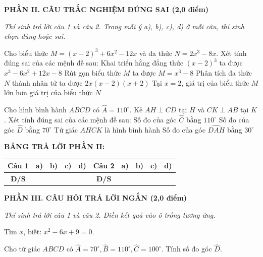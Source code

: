 \documentclass[12pt,a4paper]{article}
\begin{document}
\setcounter{ex}{0}
\noindent\textbf{\large PHẦN II. CÂU TRẮC NGHIỆM ĐÚNG SAI (2,0 điểm)}

\textit{Thí sinh trả lời câu 1 và câu 2. Trong mỗi ý a), b), c), d) ở mỗi câu, thí sinh chọn đúng hoặc sai.}

\vspace{1mm}
\begin{ex}
Cho biểu thức $M = (x - 2)^3 + 6x^2 - 12x$ và đa thức $N = 2x^3 - 8x$. Xét tính đúng sai của các mệnh đề sau:
\choiceTF
{\True Khai triển hằng đẳng thức $(x - 2)^3$ ta được $x^3 - 6x^2 + 12x - 8$}
{\True Rút gọn biểu thức $M$ ta được $M = x^3 - 8$}
{\True Phân tích đa thức $N$ thành nhân tử ta được $2x(x - 2)(x + 2)$}
{Tại $x = 2$, giá trị của biểu thức $M$ lớn hơn giá trị của biểu thức $N$}
\end{ex}

\begin{ex}
Cho hình bình hành $ABCD$ có $\widehat{A} = 110^\circ$. Kẻ $AH \perp CD$ tại $H$ và $CK \perp AB$ tại $K$. Xét tính đúng sai của các mệnh đề sau:
\choiceTF
{\True Số đo của góc $\widehat{C}$ bằng $110^\circ$}
{\True Số đo của góc $\widehat{D}$ bằng $70^\circ$}
{\True Tứ giác $AHCK$ là hình bình hành}
{Số đo của góc $\widehat{DAH}$ bằng $30^\circ$}
\end{ex}


\noindent\textbf{BẢNG TRẢ LỜI PHẦN II:}
\begin{center}
\begin{tabular}{|c|c|c|c|c||c|c|c|c|c|}
\hline
\textbf{Câu 1} & \textbf{a)} & \textbf{b)} & \textbf{c)} & \textbf{d)} & \textbf{Câu 2} & \textbf{a)} & \textbf{b)} & \textbf{c)} & \textbf{d)} \\
\hline
\textbf{Đ/S} & \rule{0pt}{0.6cm} & & & & \textbf{Đ/S} & & & & \\
\hline
\end{tabular}
\end{center}
\vspace{2mm}

\setcounter{ex}{0}
\noindent\textbf{\large PHẦN III. CÂU HỎI TRẢ LỜI NGẮN (2,0 điểm)}

\textit{Thí sinh trả lời câu 1 và câu 2. Điền kết quả vào ô trống tương ứng.}

\vspace{1mm}
\begin{ex}
Tìm $x$, biết: $x^2 - 6x + 9 = 0$. 
\end{ex}

\begin{ex}
Cho tứ giác $ABCD$ có $\widehat{A} = 70^\circ, \widehat{B} = 110^\circ, \widehat{C} = 100^\circ$. Tính số đo góc $\widehat{D}$. 
\end{ex}
\end{document}
